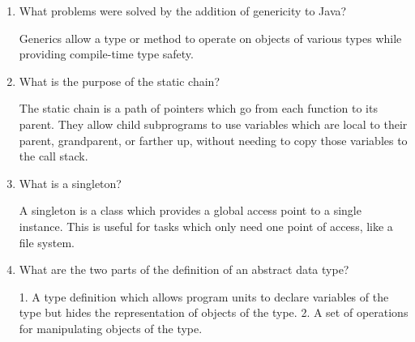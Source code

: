 \begin{enumerate}

  \item What problems were solved by the addition
    of genericity to Java?

   \begin{answer}
    Generics allow a type or method to operate on objects of various types while providing compile-time type safety.
    \end{answer}

  \item What is the purpose of the static chain?

    \begin{answer}
    The static chain is a path of pointers which go from each function to its parent. They allow child subprograms to use variables which are local to their parent, grandparent, or farther up, without needing to copy those variables to the call stack.
    \end{answer}
  \item What is a singleton?

    \begin{answer}
    A singleton is a class which provides a global access point to a single instance. This is useful for tasks which only need one point of access, like a file system.
    \end{answer}

  \item What are the two parts of the definition 
    of an abstract data type?

   \begin{answer}
    1. A type definition which allows program units to declare variables of the type but hides the representation of objects of the type. 2. A set of operations for manipulating objects of the type.
    \end{answer}

  \end{enumerate}


